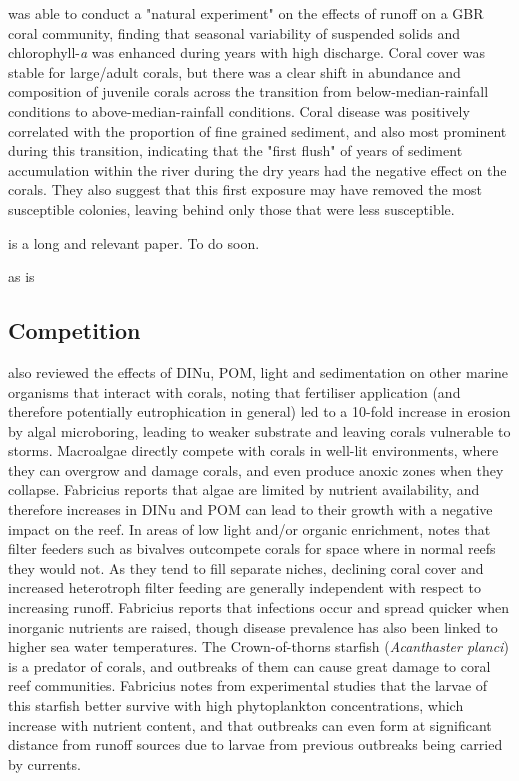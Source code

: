 \documentclass[11pt,a4paper]{article}
\begin{document}
\cite{Thompson2014} was able to conduct a "natural experiment" on the effects of runoff on a GBR coral community, finding that seasonal variability of suspended solids and chlorophyll-\textit{a} was enhanced during years with high discharge. Coral cover was stable for large/adult corals, but there was a clear shift in abundance and composition of juvenile corals across the transition from below-median-rainfall conditions to above-median-rainfall conditions. Coral disease was positively correlated with the proportion of fine grained sediment, and also most prominent during this transition, indicating that the "first flush" of years of sediment accumulation within the river during the dry years had the negative effect on the corals. They also suggest that this first exposure may have removed the most susceptible colonies, leaving behind only those that were less susceptible.

\cite{Uthicke2010} is a long and relevant paper. To do soon.

as is \cite{Erftemeijer2012}


\subsection{Competition}


\cite{Fabricius2005} also reviewed the effects of DINu, POM, light and sedimentation on other marine organisms that interact with corals, noting that fertiliser application (and therefore potentially eutrophication in general) led to a 10-fold increase in erosion by algal microboring, leading to weaker substrate and leaving corals vulnerable to storms. Macroalgae directly compete with corals in well-lit environments, where they can overgrow and damage corals, and even produce anoxic zones when they collapse. Fabricius reports that algae are limited by nutrient availability, and therefore increases in DINu and POM can lead to their growth with a negative impact on the reef.
In areas of low light and/or organic enrichment, \cite{Fabricius2005} notes that filter feeders such as bivalves outcompete corals for space where in normal reefs they would not. As they tend to fill separate niches, declining coral cover and increased heterotroph filter feeding are generally independent with respect to increasing runoff.
Fabricius reports that infections occur and spread quicker when inorganic nutrients are raised, though disease prevalence has also been linked to higher sea water temperatures.
The Crown-of-thorns starfish (\textit{Acanthaster planci}) is a predator of corals, and outbreaks of them can cause great damage to coral reef communities. Fabricius notes from experimental studies that the larvae of this starfish better survive with high phytoplankton concentrations, which increase with nutrient content, and that outbreaks can even form at significant distance from runoff sources due to larvae from previous outbreaks being carried by currents.
\end{document}
